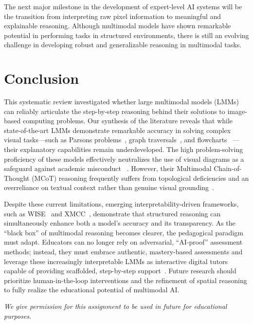 \documentclass[sigconf, nonacm]{acmart}
\begin{document}
The next major milestone in the development of expert-level AI systems will 
be the transition from interpreting raw pixel information to meaningful and 
explainable reasoning. Although multimodal models have shown remarkable 
potential in performing tasks in structured environments, there is still 
an evolving challenge in developing robust and generalizable reasoning in 
multimodal tasks.


\section{Conclusion}
This systematic review investigated whether large multimodal models (LMMs) 
can reliably articulate the step-by-step reasoning behind their solutions to 
image-based computing problems. Our synthesis of the literature reveals that 
while state-of-the-art LMMs demonstrate remarkable accuracy in solving complex 
visual tasks---such as Parsons problems~\cite{hou2024more}, graph 
traversals~\cite{gutierrez2024seeing}, and flowcharts~%
\cite{singh2024flowvqa}---their explanatory capabilities remain underdeveloped. 
The high problem-solving proficiency of these models effectively neutralizes 
the use of visual diagrams as a safeguard against academic misconduct~%
\cite{gutierrez2024seeing, hou2024more}. However, their Multimodal 
Chain-of-Thought (MCoT) reasoning frequently suffers from topological 
deficiencies and an overreliance on textual context rather than genuine visual 
grounding~\cite{singh2024flowvqa, denny2023conversing}.

Despite these current limitations, emerging interpretability-driven frameworks, 
such as WISE~\cite{jiang2025wise} and XMCC~\cite{wang2026bridging}, demonstrate 
that structured reasoning can simultaneously enhance both a model's accuracy 
and its transparency. As the ``black box'' of multimodal reasoning becomes 
clearer, the pedagogical paradigm must adapt. Educators can no longer rely on 
adversarial, ``AI-proof'' assessment methods; instead, they must embrace 
authentic, mastery-based assessments and leverage these increasingly interpretable 
LMMs as interactive digital tutors capable of providing scaffolded, step-by-step 
support~\cite{ramachandran2025how, gutierrez2024seeing}. Future research should 
prioritize human-in-the-loop interventions and the refinement of spatial 
reasoning to fully realize the educational potential of multimodal AI.


\vspace{1em}
\noindent \textit{We give permission for this assignment to be used in future for educational purposes.}





\appendix
\end{document}
